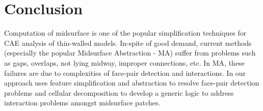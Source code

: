 \section{Conclusion}

Computation of midsurface is one of the popular simplification techniques for CAE analysis of  thin-walled models. In-spite of good demand, current methods (especially the popular Midsurface Abstraction - MA) suffer from problems such as gaps, overlaps, not lying midway, improper connections, etc.  In MA, these failures are due to complexities of face-pair detection and interactions. In our approach uses feature simplification and abstraction to resolve face-pair detection problems and  cellular decomposition to develop a generic logic to address interaction problems amongst midsurface patches. 

\vspace{-5mm}

\begin{figure}[!h]
\centering     %
{} \quad
{}\quad
{} \quad
{}
\end{figure}


